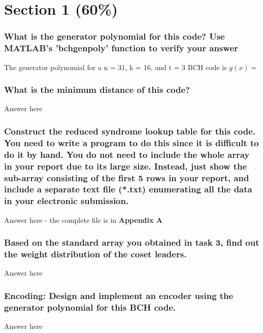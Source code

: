 \documentclass[a4paper]{report}
\begin{document}
\section*{Section 1 (60\%)}

\subsubsection*{What is the generator polynomial for this code? Use MATLAB’s ’bchgenpoly’ function to verify your answer}

The generator polynomial for a n = 31, k = 16, and t = 3 BCH code is $g(x) = $ \\

\subsubsection*{What is the minimum distance of this code?}

Answer here \\

\subsubsection*{Construct the reduced syndrome lookup table for this code. You need
to write a program to do this since it is difficult to do it by hand. You
do not need to include the whole array in your report due to its large
size. Instead, just show the sub-array consisting of the first 5 rows in your
report, and include a separate text file (*.txt) enumerating all the data in
your electronic submission.}

Answer here - the complete file is in \textbf{Appendix A}\\

\subsubsection*{Based on the standard array you obtained in task 3, find out the weight distribution of the coset leaders.}

Answer here \\

\subsubsection*{Encoding: Design and implement an encoder using the generator polynomial for this BCH code.}

Answer here \\
\end{document}
